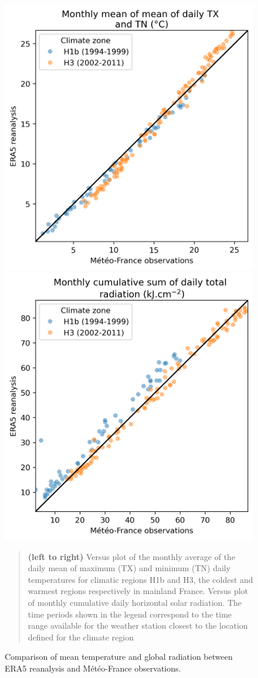 \documentclass[11pt]{article}
\begin{document}
    \begin{figure}[ht]
        \centering
        \includegraphics[width=0.49\columnwidth]{figures/comparison_TM_MF_ERA5.png}
        \includegraphics[width=0.49\columnwidth]{figures/comparison_GLOT_MF_ERA5.png}
        \caption{\label{fig:comparison_mf} Comparison of mean temperature and global radiation between ERA5 reanalysis and Météo-France observations.}
        \begin{quote}
            \vspace{-2mm}
            \small\noindent
            \textbf{(left to right)} Versus plot of the monthly average of the daily mean of maximum (TX) and minimum (TN) daily temperatures for climatic regions H1b and H3, the coldest and warmest regions respectively in mainland France. Versus plot of monthly cumulative daily horizontal solar radiation. The time periods shown in the legend correspond to the time range available for the weather station closest to the location defined for the climate region 
          \end{quote}
    \end{figure}

\end{document}
